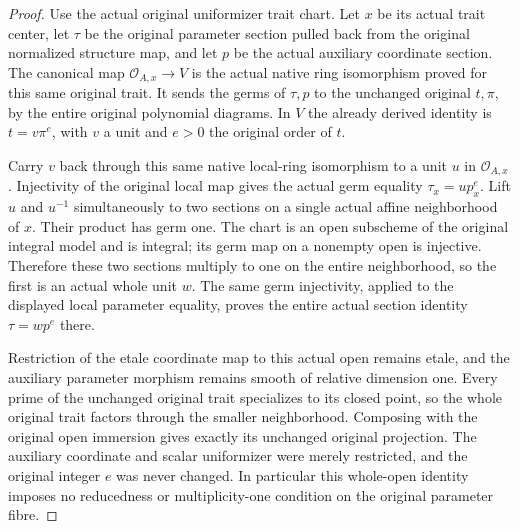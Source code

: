 \begin{proof}
Use the actual original uniformizer trait chart. Let $x$ be its actual trait center, let $\tau$ be the original parameter section pulled back from the original normalized structure map, and let $p$ be the actual auxiliary coordinate section. The canonical map $\mathcal O_{A,x}\to V$ is the actual native ring isomorphism proved for this same original trait. It sends the germs of $\tau,p$ to the unchanged original $t,\pi$, by the entire original polynomial diagrams. In $V$ the already derived identity is $t=v\pi^e$, with $v$ a unit and $e>0$ the original order of $t$.

Carry $v$ back through this same native local-ring isomorphism to a unit $u$ in $\mathcal O_{A,x}$. Injectivity of the original local map gives the actual germ equality $\tau_x=u p_x^e$. Lift $u$ and $u^{-1}$ simultaneously to two sections on a single actual affine neighborhood of $x$. Their product has germ one. The chart is an open subscheme of the original integral model and is integral; its germ map on a nonempty open is injective. Therefore these two sections multiply to one on the entire neighborhood, so the first is an actual whole unit $w$. The same germ injectivity, applied to the displayed local parameter equality, proves the entire actual section identity $\tau=w p^e$ there.

Restriction of the etale coordinate map to this actual open remains etale, and the auxiliary parameter morphism remains smooth of relative dimension one. Every prime of the unchanged original trait specializes to its closed point, so the whole original trait factors through the smaller neighborhood. Composing with the original open immersion gives exactly its unchanged original projection. The auxiliary coordinate and scalar uniformizer were merely restricted, and the original integer $e$ was never changed. In particular this whole-open identity imposes no reducedness or multiplicity-one condition on the original parameter fibre.
\end{proof}
